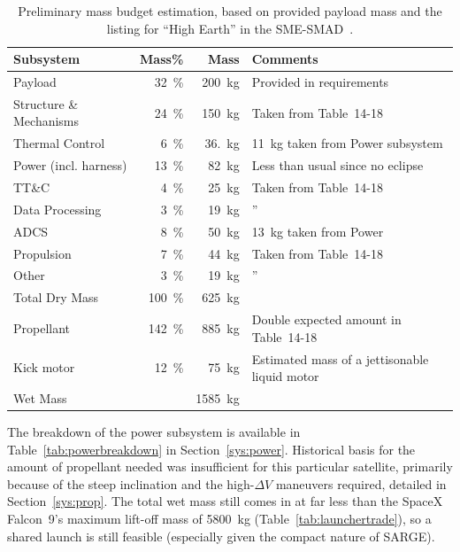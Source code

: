 \documentclass[9pt]{article}
\begin{document}
\begin{table}[h]
  \centering
  \begin{tabular}{l|r r l}
    \toprule
    Subsystem & Mass\% & Mass & Comments \\
    \midrule
    Payload & \qty{32}{\percent} & \qty{200}{\kilo\gram} & Provided in requirements \\
    Structure \& Mechanisms & \qty{24}{\percent} & \qty{150}{\kilo\gram} & Taken from Table~14-18\\
    Thermal Control & \qty{6}{\percent} & \qty{36.}{\kilo\gram} & \qty{11}{\kilo\gram} taken from Power subsystem\\ 
    Power (incl. harness) & \qty{13}{\percent} & \qty{82}{\kilo\gram}&Less than usual since no eclipse\\
    TT\&C & \qty{4}{\percent} & \qty{25}{\kilo\gram}&Taken from Table~14-18\\
    Data Processing & \qty{3}{\percent} & \qty{19}{\kilo\gram}&''\\
    ADCS & \qty{8}{\percent} & \qty{50}{\kilo\gram}& \qty{13}{\kilo\gram} taken from Power\\
    Propulsion & \qty{7}{\percent} & \qty{44}{\kilo\gram}&Taken from Table~14-18\\
    Other & \qty{3}{\percent} & \qty{19}{\kilo\gram}&''\\
    \midrule 
    Total Dry Mass & \qty{100}{\percent} & \qty{625}{\kilo\gram} & \\
    Propellant & \qty{142}{\percent} & \qty{885}{\kilo\gram} & Double expected amount in Table~14-18\\
    Kick motor & \qty{12}{\percent} & \qty{75}{\kilo\gram} & Estimated mass of a jettisonable liquid motor\\
    \midrule 
    Wet Mass & & \qty{1585}{\kilo\gram} & \\
    \bottomrule
  \end{tabular}
  \caption{Preliminary mass budget estimation, based on provided payload mass and the listing for ``High Earth'' in the SME-SMAD~\cite{sme}.}
  \label{tab:mass}
\end{table}

The breakdown of the power subsystem is available in Table~\ref{tab:powerbreakdown} in Section~\ref{sys:power}.
Historical basis for the amount of propellant needed was insufficient for this particular satellite, primarily because of the steep inclination and the high-$\Delta V$ maneuvers required, detailed in Section~\ref{sys:prop}.
The total wet mass still comes in at far less than the SpaceX Falcon~9's maximum lift-off mass of \qty{5800}{\kilo\gram} (Table~\ref{tab:launchertrade}), so a shared launch is still feasible (especially given the compact nature of SARGE).
\end{document}
